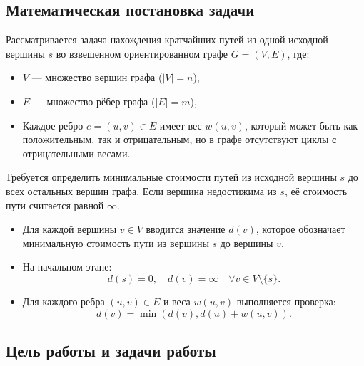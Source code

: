\documentclass[12pt]{article}
\begin{document}
\subsection{Математическая постановка задачи}

Рассматривается задача нахождения кратчайших путей из одной исходной вершины \( s \) во взвешенном ориентированном графе \( G = (V, E) \), где:
\begin{itemize}
    \item \( V \) — множество вершин графа (\( |V| = n \)),
    \item \( E \) — множество рёбер графа (\( |E| = m \)),
    \item Каждое ребро \( e = (u, v) \in E \) имеет вес \( w(u, v) \), который может быть как положительным, так и отрицательным, но в графе отсутствуют циклы с отрицательными весами.
\end{itemize}

Требуется определить минимальные стоимости путей из исходной вершины \( s \) до всех остальных вершин графа. Если вершина недостижима из \( s \), её стоимость пути считается равной \( \infty \).

\begin{itemize}
    \item Для каждой вершины \( v \in V \) вводится значение \( d(v) \), которое обозначает минимальную стоимость пути из вершины \( s \) до вершины \( v \).
    \item На начальном этапе:
    \[
    d(s) = 0, \quad d(v) = \infty \quad \forall v \in V \setminus \{s\}.
    \]
    \item Для каждого ребра \( (u, v) \in E \) и веса \( w(u, v) \) выполняется проверка:
    \[
    d(v) = \min(d(v), d(u) + w(u, v)).
    \]
\end{itemize}

\subsection{Цель работы и задачи работы}
\end{document}
